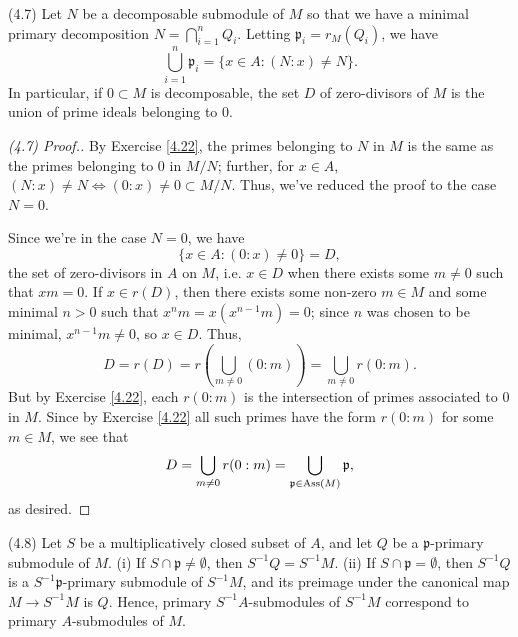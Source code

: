 (4.7) Let $N$ be a decomposable submodule of $M$ so that we have a minimal primary decomposition $N = \bigcap_{i=1}^n Q_i$. Letting $\mathfrak{p}_i = r_M(Q_i)$, we have
$$\bigcup_{i=1}^n \mathfrak{p}_i = \{x \in A : (N:x) \neq N\}.$$
In particular, if $0 \subset M$ is decomposable, the set $D$ of zero-divisors of $M$ is the union of prime ideals belonging to $0$.

\begin{proof}[(4.7) Proof.]
By Exercise \ref{4.22}, the primes belonging to $N$ in $M$ is the same as the primes belonging to $0$ in $M/N$; further, for $x \in A$, 
$(N:x) \neq N \iff (0:x) \neq 0 \subset M/N$. Thus, we've reduced the proof to the case $N = 0$.

Since we're in the case $N = 0$, we have
$$\{x \in A : (0:x) \neq 0\} = D,$$
the set of zero-divisors in $A$ on $M$, i.e. $x \in D$ when there exists some $m \neq 0$ such that $xm = 0$. If $x \in r(D)$, then there exists some non-zero $m \in M$ and some minimal $n > 0$
such that $x^n m = x(x^{n-1}m) = 0$; since $n$ was chosen to be minimal, $x^{n-1}m \neq 0$, so $x \in D$. Thus, 
$$D = r(D) = r\left(\bigcup_{m \neq 0}(0:m)\right) = \bigcup_{m \neq 0}r(0:m).$$
But by Exercise \ref{4.22}, each $r(0:m)$ is the intersection of primes associated to $0$ in $M$. Since by Exercise \ref{4.22} all such primes have the form $r(0:m)$ for some $m \in M$,
we see that 
$$D = \bigcup_{m \neq 0}r(0:m) = \bigcup_{\mathfrak{p} \in \operatorname{Ass}(M)} \mathfrak{p},$$
as desired.
\end{proof}

(4.8) Let $S$ be a multiplicatively closed subset of $A$, and let $Q$ be a $\mathfrak{p}$-primary submodule of $M$. (i) If $S \cap \mathfrak{p} \neq \emptyset$, then $S^{-1}Q = S^{-1}M$. 
(ii) If $S \cap \mathfrak{p} = \emptyset$, then $S^{-1}Q$ is a $S^{-1}\mathfrak{p}$-primary submodule of $S^{-1}M$, and its preimage under the canonical map $M \to S^{-1}M$ is $Q$. Hence,
primary $S^{-1}A$-submodules of $S^{-1}M$ correspond to primary $A$-submodules of $M$.

